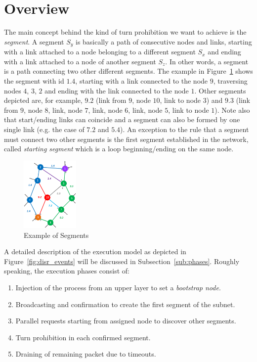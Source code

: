
\section{\disr{} Overview}

\label{sec:disr_concepts}
The main concept behind the kind of turn prohibition we want to
achieve is the \emph{segment}. A segment $S_y$ is basically a path of consecutive
nodes and links, starting with a link attached to a node belonging to
a different segment $S_x$ and ending with a link attached to a
node of another segment $S_z$. In other words, a segment is
a path connecting two other different segments. The example
in Figure~\ref{fig:segments} shows the segment with id $1.4$, starting
with a link connected to the node $9$, traversing nodes
$4$, $3$, $2$ and ending with the link connected to the node $1$. Other
segments depicted are, for example, $9.2$ (link from $9$, node $10$, link to node $3$) and $9.3$
(link from $9$, node $8$, link, node $7$, link, node $6$, link, node $5$, link to node $1$). Note
also that start/ending links can coincide and a segment can also be
formed by one single link (e.g. the case of $7.2$ and $5.4$).
An exception to the rule that a segment must connect two other
segments is the first segment established in the network, called
\emph{starting segment} which is a loop beginning/ending on the same
node.

\begin{figure}
\centering
    \includegraphics[width=0.25\textwidth]{pictures/network_slice.eps}
  \caption{Example of Segments}
  \label{fig:segments}
\end{figure}

A detailed description of the \disr{} execution model as depicted in
Figure~\ref{fig:disr_events} will be discussed in
Subsection~\ref{sub:phases}. Roughly speaking, the execution phases consist of:
\begin{enumerate}
\item Injection of the \disr{} process from an upper layer to set a \emph{bootstrap
node}.
\item Broadcasting and confirmation to create the first segment of the subnet.
\item Parallel requests starting from assigned node to discover other
segments. 
\item Turn prohibition in each confirmed segment.
\item Draining of remaining packet due to timeouts.
\end{enumerate}

